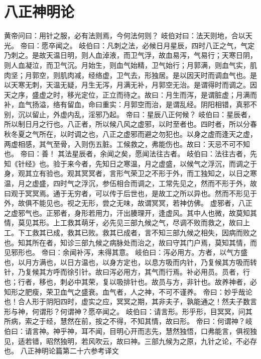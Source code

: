 \documentclass[a4paper,12pt,UTF8,twoside]{ctexbook}
\begin{document}
\chapter{八正神明论}
黄帝问曰：用针之服，必有法则焉，今何法何则？
岐伯对曰：法天则地，合以天光。
帝曰：愿卒闻之。
岐伯曰：凡刺之法，必候日月星辰，四时八正之气，气定乃刺之。是故天温日明，则人血淖液，而卫气浮，故血易泻，气易行；天寒日阴，则人血凝泣，而卫气沉。月始生，则血气始精，卫气始行；月郭满，则血气实，肌肉坚；月郭空，则肌肉减，经络虚，卫气去，形独居。是以因天时而调血气也。是以天寒无刺，天温无疑，月生无泻，月满无补，月郭空无治。是谓得时而调之。因天之序，盛虚之时，移光定位，正立而待之。故曰：月生而泻，是谓脏虚；月满而补，血气扬溢，络有留血，命曰重实：月郭空而治，是谓乱经。阴阳相错，真邪不别，沉以留止，外虚内乱，淫邪乃起。
帝曰：星辰八正何候？
岐伯曰：星辰者，所以制日月之行也。八正者，所以候八风之虚邪，以时至者也。四时者，所以分春秋冬夏之气所在，以时调之也，八正之虚邪而避之勿犯也。以身之虚而逢天之虚，两虚相感，其气至骨，入则伤五脏。工候救之，弗能伤也。故曰：天忌不可不知也。
帝曰：善！
其法星辰者，余闻之矣，愿闻法往古者。
岐伯曰：法往古者，先知《针经》也。验于来今者，先知日之寒温，月之虚盛，以候气之浮沉，而调之于身，观其立有验也。观其冥冥者，言形气荣卫之不形于外，而工独知之，以日之寒温，月之虚盛，四时气之浮沉，参伍相合而调之，工常先见之，然而不形于外，故曰观于冥冥焉。通于无穷者，可以传于后世也，是故工之所以异也。然而不形见于外，故俱不能见也。视之无形，尝之无味，故谓冥冥，若神仿佛。
虚邪者，八正之虚邪气也。正邪者，身形若用力，汗出腠理开，逢虚风。其中人也微，故莫知其情，莫见其形。上工救其萌牙，必先见三部九候之气，尽调不败而救之，故曰上工。下工救其已成，救其已败。救其已成者，言不知三部九候之相失，因病而败之也。知其所在者，知诊三部九候之病脉处而治之，故曰守其门户焉，莫知其情，而见邪形也。
帝曰：余闻补泻，未得其意。
岐伯曰：泻必用方。方者，以气方盛也，以月方满也，以日方温也，以身方定也，以息方吸而内针，乃复候其方吸而转针，乃复候其方呼而徐引针。故曰泻必用方，其气而行焉。补必用员。员者，行也；行者，移也，刺必中其荣，复以吸排针也。故员与方，非针也。故养神者，必知形之肥瘦，荣卫血气之盛衰。血气者，人之神，不可不谨养。
帝曰：妙乎哉论也！合人形于阴阳四时，虚实之应，冥冥之期，其非夫子，孰能通之！然夫子数言形与神，何谓形？何谓神？愿卒闻之。
岐伯曰：请言形。形乎形，目冥冥，问其所病，索之于经，慧然在前，按之不得，不知其情，故曰形。
帝曰：何谓神？岐伯曰：请言神。神乎神，耳不闻，目明心开而志先，慧然独悟，口弗能言，俱视独见，适若错，昭然独明，若风吹云，故曰神。三部九候为之原，九针之论，不必存也。
八正神明论篇第二十六参考译文
\end{document}
